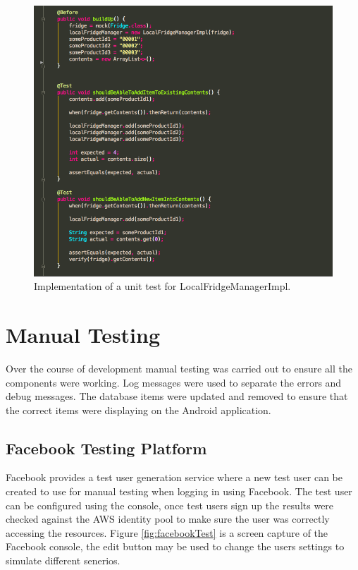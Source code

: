 \documentclass[a4paper, 11pt]{article}
\begin{document}
\begin{figure}[!htbp]
\centering
\includegraphics[width=\textwidth]{unitTest}
\caption{Implementation of a unit test for LocalFridgeManagerImpl.}\label{fig:unitTest}
\end{figure}
\clearpage

\section{Manual Testing} 
Over the course of development manual testing was carried out to ensure all the components were working. Log messages were used to separate the errors and debug messages. The database items were updated and removed to ensure that the correct items were displaying on the Android application.

\subsection{Facebook Testing Platform}
Facebook provides a test user generation service where a new test user can be created to use for manual testing when logging in using Facebook. The test user can be configured using the console, once test users sign up the results were checked against the AWS identity pool to make sure the user was correctly accessing the resources. 
Figure \ref{fig:facebookTest} is a screen capture of the Facebook console, the edit button may be used to change the users settings to simulate different senerios.
\vspace{\baselineskip}
\end{document}
